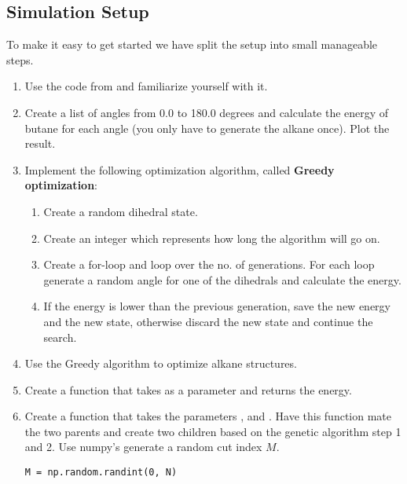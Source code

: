 \documentclass{article}
\begin{document}
\newpage

\subsection{Simulation Setup}

To make it easy to get started we have split the setup into small manageable steps.

\begin{enumerate}
    \item Use the code from  and familiarize yourself with it.

    \item Create a list of angles from 0.0 to 180.0 degrees and calculate the energy of butane for each angle (you only have to generate the alkane once).
    Plot the result.

    \item Implement the following optimization algorithm, called \textbf{Greedy optimization}:
        \begin{enumerate}
            \item Create a random dihedral state.
            \item Create an integer  which represents how long the algorithm will go on.
            \item Create a for-loop and loop over the no. of generations. 
            For each loop generate a random angle for one of the dihedrals and calculate the energy.
            \item If the energy is lower than the previous generation, save the new energy and the new state, otherwise discard the new state and continue the search.
        \end{enumerate}

    \item Use the Greedy algorithm to optimize alkane structures.

    \item Create a function that takes  as a parameter and returns the energy.

    \item Create a function that takes the parameters
    ,
     and
    .
    Have this function mate the two parents and create two children based on the genetic algorithm step 1 and 2.
    Use numpy's  generate a random cut index $M$.

\begin{lstlisting}
M = np.random.randint(0, N)
\end{lstlisting}


\end{enumerate}
\end{document}
